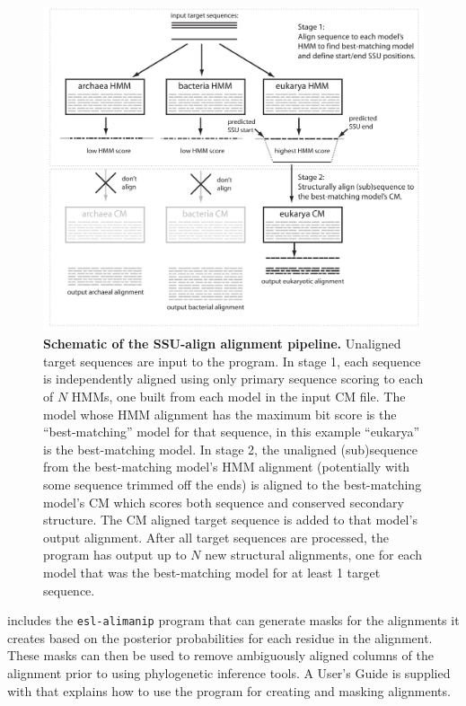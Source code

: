 \begin{figure}
  \begin{center}
\includegraphics[width=6in]{Figures/ssualign-schematic}
        \caption[Schematic of the  alignment
          pipeline]{\textbf{Schematic of the SSU-align
          alignment pipeline.} Unaligned target sequences are input to
        the program. In stage 1, each sequence is independently
        aligned using only primary sequence scoring to each of $N$
        HMMs, one built from each model in the input CM file. The
        model whose HMM alignment has the maximum bit score is the
        ``best-matching'' model for that sequence, in this example
        ``eukarya'' is the best-matching model. In stage 2, the
        unaligned (sub)sequence from the best-matching model's HMM
        alignment (potentially with some sequence trimmed off the
        ends) is aligned to the best-matching model's CM which scores
        both sequence and conserved secondary structure. The CM
        aligned target sequence is added to that model's output
        alignment. After all target sequences are processed, the
        program has output up to $N$ new structural alignments, one
        for each model that was the best-matching model for at least 1
        target sequence.}
  \end{center}
\label{fig:ssualign}
\end{figure}

 includes the {\tt esl-alimanip} program that can
generate masks for the alignments it creates based on the posterior
probabilities for each residue in the alignment. These masks can then
be used to remove ambiguously aligned columns of the alignment prior
to using phylogenetic inference tools. %
A User's Guide is supplied with  that
explains how to use the program for creating and masking alignments.

